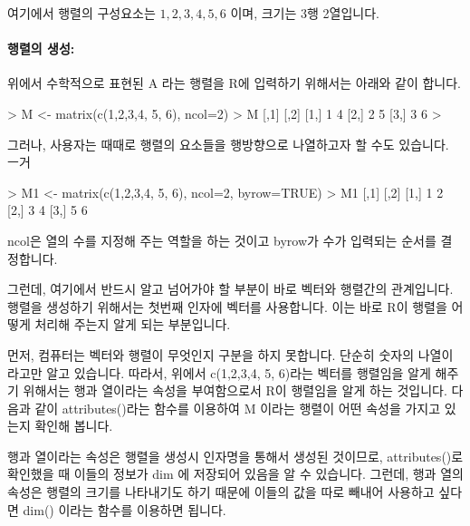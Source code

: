 \documentclass{book}
\begin{document}
여기에서 행렬의 구성요소는 $1,2,3,4, 5, 6$ 이며, 크기는 3행 2열입니다.

\paragraph{행렬의 생성:} 위에서 수학적으로 표현된 A 라는 행렬을 R에 입력하기 위해서는 아래와 같이 합니다. 

\begin{Schunk}
\begin{Soutput}
> M <- matrix(c(1,2,3,4, 5, 6), ncol=2)
> M
     [,1] [,2]
[1,]    1    4
[2,]    2    5
[3,]    3    6
>
\end{Soutput}
\end{Schunk}

그러나, 사용자는 때때로 행렬의 요소들을 행방향으로 나열하고자 할 수도 있습니다. 
ㅡ거
\begin{Schunk}
\begin{Soutput}
> M1 <- matrix(c(1,2,3,4, 5, 6), ncol=2, byrow=TRUE)
> M1
     [,1] [,2]
[1,]    1    2
[2,]    3    4
[3,]    5    6

\end{Soutput}
\end{Schunk}

ncol은 열의 수를 지정해 주는 역할을 하는 것이고 byrow가 수가 입력되는 순서를 결정합니다.

그런데, 여기에서 반드시 알고 넘어가야 할 부분이 바로 벡터와 행렬간의 관계입니다. 
행렬을 생성하기 위해서는 첫번째 인자에 벡터를 사용합니다. 
이는 바로 R이 행렬을 어떻게 처리해 주는지 알게 되는 부분입니다. 

먼저, 컴퓨터는 벡터와 행렬이 무엇인지 구분을 하지 못합니다. 
단순히 숫자의 나열이라고만 알고 있습니다. 
따라서, 위에서 c(1,2,3,4, 5, 6)라는 벡터를 행렬임을 알게 해주기 위해서는 행과 열이라는 속성을 부여함으로서 
R이 행렬임을 알게 하는 것입니다.
다음과 같이 attributes()라는 함수를 이용하여 M 이라는 행렬이 어떤 속성을 가지고 있는지 확인해 봅니다. 

\begin{Schunk}
\end{Schunk}

행과 열이라는 속성은 행렬을 생성시 인자명을 통해서 생성된 것이므로, attributes()로 확인했을 때 이들의 정보가 dim 에 저장되어 있음을 알 수 있습니다. 
그런데, 행과 열의 속성은 행렬의 크기를 나타내기도 하기 때문에 이들의 값을 따로 빼내어 사용하고 싶다면 dim() 이라는 함수를 이용하면 됩니다. 
\end{document}
